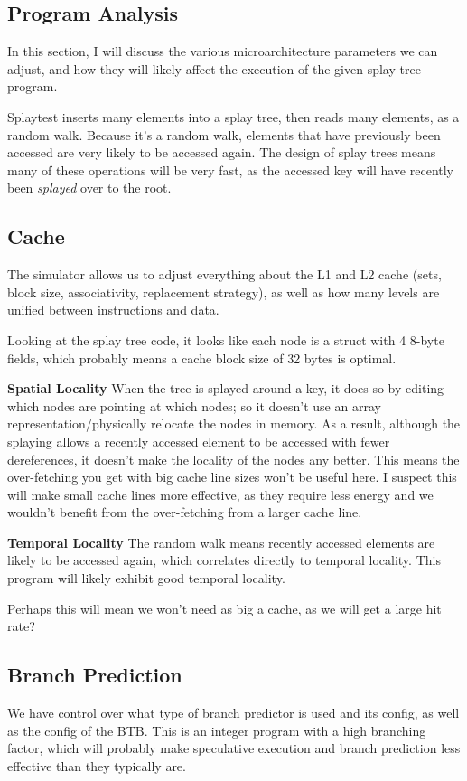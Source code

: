 \documentclass{article}
\begin{document}
\begin{multicols}{2}
  \section{Program Analysis}
  In this section, I will discuss the various microarchitecture parameters we can adjust, and how they will likely affect the execution of the given splay tree program.

  Splaytest inserts many elements into a splay tree, then reads many elements, as a random walk. Because it's a random walk, elements that have previously been accessed are very likely to be accessed again. The design of splay trees means many of these operations will be very fast, as the accessed key will have recently been \textit{splayed} over to the root.

  \subsection{Cache}
  The simulator allows us to adjust everything about the L1 and L2 cache (sets, block size, associativity, replacement strategy), as well as how many levels are unified between instructions and data.

  Looking at the splay tree code, it looks like each node is a struct with 4 8-byte fields, which probably means a cache block size of 32 bytes is optimal.

  \textbf{Spatial Locality} When the tree is splayed around a key, it does so by editing which nodes are pointing at which nodes; so it doesn't use an array representation/physically relocate the nodes in memory. As a result, although the splaying allows a recently accessed element to be accessed with fewer dereferences, it doesn't make the locality of the nodes any better. This means the over-fetching you get with big cache line sizes won't be useful here. I suspect this will make small cache lines more effective, as they require less energy and we wouldn't benefit from the over-fetching from a larger cache line.

  \textbf{Temporal Locality} The random walk means recently accessed elements are likely to be accessed again, which correlates directly to temporal locality. This program will likely exhibit good temporal locality.

  Perhaps this will mean we won't need as big a cache, as we will get a large hit rate?

  \subsection{Branch Prediction}
  We have control over what type of branch predictor is used and its config, as well as the config of the BTB. This is an integer program with a high branching factor, which will probably make speculative execution and branch prediction less effective than they typically are.


\end{multicols}
\end{document}
